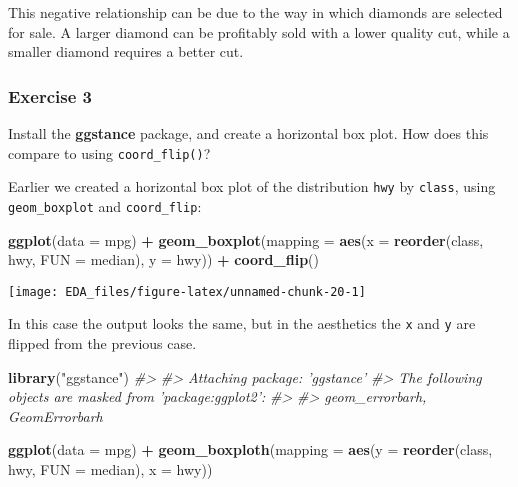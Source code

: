 \documentclass[]{book}
\newenvironment{Shaded}{\begin{snugshade}}{\end{snugshade}}
\newcommand{\CommentTok}[1]{\textcolor[rgb]{0.56,0.35,0.01}{\textit{#1}}}
\newcommand{\DataTypeTok}[1]{\textcolor[rgb]{0.13,0.29,0.53}{#1}}
\newcommand{\KeywordTok}[1]{\textcolor[rgb]{0.13,0.29,0.53}{\textbf{#1}}}
\newcommand{\NormalTok}[1]{#1}
\newcommand{\OperatorTok}[1]{\textcolor[rgb]{0.81,0.36,0.00}{\textbf{#1}}}
\newcommand{\StringTok}[1]{\textcolor[rgb]{0.31,0.60,0.02}{#1}}
\theoremstyle{plain}
\theoremstyle{remark}
\theoremstyle{definition}
\theoremstyle{definition}
\theoremstyle{definition}
\theoremstyle{remark}
\begin{document}
This negative relationship can be due to the way in which diamonds are
selected for sale. A larger diamond can be profitably sold with a lower
quality cut, while a smaller diamond requires a better cut.

\hypertarget{exercise-3-12}{%
\subsubsection{Exercise 3}\label{exercise-3-12}}

Install the \textbf{ggstance} package, and create a horizontal box plot.
How does this compare to using \texttt{coord\_flip()}?

Earlier we created a horizontal box plot of the distribution
\texttt{hwy} by \texttt{class}, using \texttt{geom\_boxplot} and
\texttt{coord\_flip}:

\begin{Shaded}
\begin{Highlighting}[]
\KeywordTok{ggplot}\NormalTok{(}\DataTypeTok{data =}\NormalTok{ mpg) }\OperatorTok{+}
\StringTok{  }\KeywordTok{geom_boxplot}\NormalTok{(}\DataTypeTok{mapping =} \KeywordTok{aes}\NormalTok{(}\DataTypeTok{x =} \KeywordTok{reorder}\NormalTok{(class, hwy, }\DataTypeTok{FUN =}\NormalTok{ median), }\DataTypeTok{y =}\NormalTok{ hwy)) }\OperatorTok{+}
\StringTok{  }\KeywordTok{coord_flip}\NormalTok{()}
\end{Highlighting}
\end{Shaded}

\begin{center}\texttt{[image: EDA\_files/figure-latex/unnamed-chunk-20-1]} \end{center}

In this case the output looks the same, but in the aesthetics the
\texttt{x} and \texttt{y} are flipped from the previous case.

\begin{Shaded}
\begin{Highlighting}[]
\KeywordTok{library}\NormalTok{(}\StringTok{"ggstance"}\NormalTok{)}
\CommentTok{#> }
\CommentTok{#> Attaching package: 'ggstance'}
\CommentTok{#> The following objects are masked from 'package:ggplot2':}
\CommentTok{#> }
\CommentTok{#>     geom_errorbarh, GeomErrorbarh}

\KeywordTok{ggplot}\NormalTok{(}\DataTypeTok{data =}\NormalTok{ mpg) }\OperatorTok{+}
\StringTok{  }\KeywordTok{geom_boxploth}\NormalTok{(}\DataTypeTok{mapping =} \KeywordTok{aes}\NormalTok{(}\DataTypeTok{y =} \KeywordTok{reorder}\NormalTok{(class, hwy, }\DataTypeTok{FUN =}\NormalTok{ median), }\DataTypeTok{x =}\NormalTok{ hwy))}
\end{Highlighting}
\end{Shaded}
\end{document}
